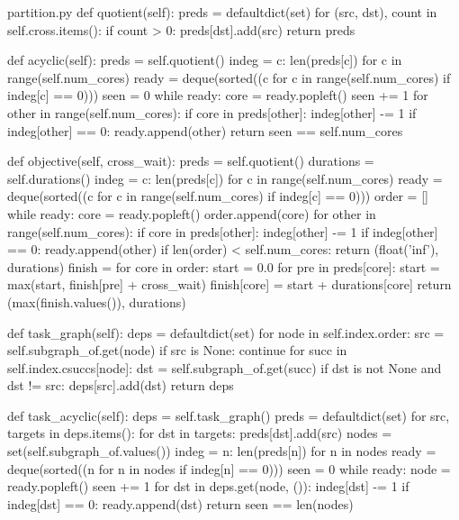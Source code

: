 \begin{Python}{partition.py}
    def quotient(self):
        preds = defaultdict(set)
        for (src, dst), count in self.cross.items():
            if count > 0:
                preds[dst].add(src)
        return preds

    def acyclic(self):
        preds = self.quotient()
        indeg = {c: len(preds[c]) for c in range(self.num_cores)}
        ready = deque(sorted((c for c in range(self.num_cores) if indeg[c] == 0)))
        seen = 0
        while ready:
            core = ready.popleft()
            seen += 1
            for other in range(self.num_cores):
                if core in preds[other]:
                    indeg[other] -= 1
                    if indeg[other] == 0:
                        ready.append(other)
        return seen == self.num_cores

    def objective(self, cross_wait):
        preds = self.quotient()
        durations = self.durations()
        indeg = {c: len(preds[c]) for c in range(self.num_cores)}
        ready = deque(sorted((c for c in range(self.num_cores) if indeg[c] == 0)))
        order = []
        while ready:
            core = ready.popleft()
            order.append(core)
            for other in range(self.num_cores):
                if core in preds[other]:
                    indeg[other] -= 1
                    if indeg[other] == 0:
                        ready.append(other)
        if len(order) < self.num_cores:
            return (float('inf'), durations)
        finish = {}
        for core in order:
            start = 0.0
            for pre in preds[core]:
                start = max(start, finish[pre] + cross_wait)
            finish[core] = start + durations[core]
        return (max(finish.values()), durations)

    def task_graph(self):
        deps = defaultdict(set)
        for node in self.index.order:
            src = self.subgraph_of.get(node)
            if src is None:
                continue
            for succ in self.index.csuccs[node]:
                dst = self.subgraph_of.get(succ)
                if dst is not None and dst != src:
                    deps[src].add(dst)
        return deps

    def task_acyclic(self):
        deps = self.task_graph()
        preds = defaultdict(set)
        for src, targets in deps.items():
            for dst in targets:
                preds[dst].add(src)
        nodes = set(self.subgraph_of.values())
        indeg = {n: len(preds[n]) for n in nodes}
        ready = deque(sorted((n for n in nodes if indeg[n] == 0)))
        seen = 0
        while ready:
            node = ready.popleft()
            seen += 1
            for dst in deps.get(node, ()):
                indeg[dst] -= 1
                if indeg[dst] == 0:
                    ready.append(dst)
        return seen == len(nodes)


\end{Python}
